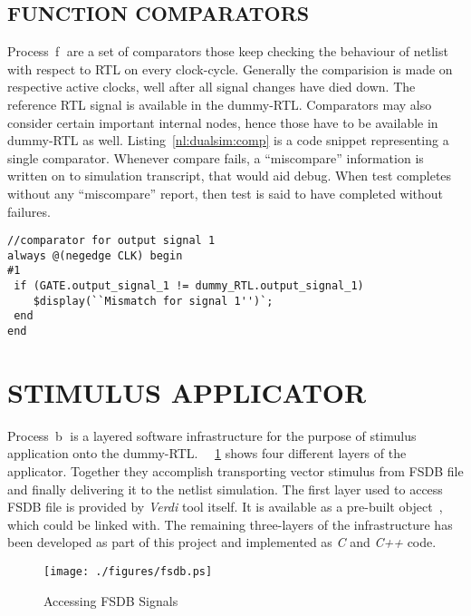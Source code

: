 \subsection{FUNCTION COMPARATORS}
Process~\textcircled{f} are a set of comparators those keep checking the behaviour of netlist with respect to RTL on every clock-cycle. Generally the comparision is made on respective active clocks, well after all signal changes have died down. The reference RTL signal is available in the dummy-RTL. Comparators may also consider certain important internal nodes, hence those have to be available in dummy-RTL as well. Listing~\ref{nl:dualsim:comp} is a code snippet representing a single comparator. Whenever compare fails, a ``miscompare'' information is written on to simulation transcript, that would aid debug. When test completes without any ``miscompare'' report, then test is said to have completed without failures.

\lstset{language=Verilog,
basicstyle=\footnotesize,
frame=shadowbox,
breaklines=true}          
\begin{lstlisting}[frame=single, caption=Cycle Based Comparison, label=nl:dualsim:comp ] 
//comparator for output signal 1 
always @(negedge CLK) begin
#1
 if (GATE.output_signal_1 != dummy_RTL.output_signal_1)
    $display(``Mismatch for signal 1'')`;
 end
end

\end{lstlisting}


\section{STIMULUS APPLICATOR}
\label{sec:dualsim:sa}
Process~\textcircled{b} is a layered software infrastructure for the purpose of stimulus application onto the dummy-RTL. ~\figurename{~\ref{fig:fsdb.ps}} shows four different layers of the applicator. Together they accomplish transporting vector stimulus from FSDB file and finally delivering it to the netlist simulation. The first layer used to access FSDB file is provided by {\it Verdi} tool itself. It is available as a pre-built object~\citep{Verdi:FsdbReader}, which could be linked with. The remaining three-layers of the infrastructure has been developed as part of this project and implemented as {\it C} and {\it C++} code.

\begin{figure}[h]
\centering
\texttt{[image: ./figures/fsdb.ps]}
\caption{Accessing FSDB Signals}
\label{fig:fsdb.ps}
\end{figure}

